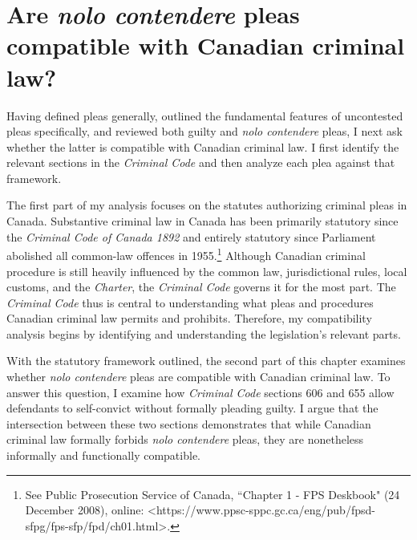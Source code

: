 \chapter{Are \textit{nolo contendere} pleas compatible with Canadian criminal law?}

\setcounter{footnote}{104}

Having defined pleas generally, outlined the fundamental features of uncontested pleas specifically, and reviewed both guilty and \textit{nolo contendere} pleas, I next ask whether the latter is compatible with Canadian criminal law. I first identify the relevant sections in the \textit{Criminal Code} and then analyze each plea against that framework. 

The first part of my analysis focuses on the statutes authorizing criminal pleas in Canada. Substantive criminal law in Canada has been primarily statutory since the \textit{Criminal Code of Canada 1892} and entirely statutory since Parliament abolished all common-law offences in 1955.\footnote{See Public Prosecution Service of Canada, ``Chapter 1 - FPS Deskbook" (24 December 2008), online: \textless https://www.ppsc-sppc.gc.ca/eng/pub/fpsd-sfpg/fps-sfp/fpd/ch01.html\textgreater.} Although Canadian criminal procedure is still heavily influenced by the common law, jurisdictional rules, local customs, and the \textit{Charter}, the \textit{Criminal Code} governs it for the most part. The \textit{Criminal Code} thus is central to understanding what pleas and procedures Canadian criminal law permits and prohibits. Therefore, my compatibility analysis begins by identifying and understanding the legislation's relevant parts. 

With the statutory framework outlined, the second part of this chapter examines whether \textit{nolo contendere} pleas are compatible with Canadian criminal law. To answer this question, I examine how \textit{Criminal Code} sections 606 and 655 allow defendants to self-convict without formally pleading guilty. I argue that the intersection between these two sections demonstrates that while Canadian criminal law formally forbids \textit{nolo contendere} pleas, they are nonetheless informally and functionally compatible.